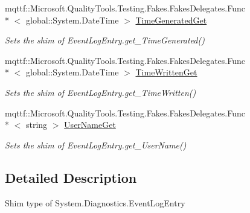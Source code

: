 \begin{DoxyCompactItemize}
mqttf\-::\-Microsoft.\-Quality\-Tools.\-Testing.\-Fakes.\-Fakes\-Delegates.\-Func\\*
$<$ global\-::\-System.\-Date\-Time $>$ \hyperlink{class_system_1_1_diagnostics_1_1_fakes_1_1_shim_event_log_entry_acc70f3bf6c18ae635d2963a784ef7a48}{Time\-Generated\-Get}
\begin{DoxyCompactList}\small\item\em Sets the shim of Event\-Log\-Entry.\-get\-\_\-\-Time\-Generated()\end{DoxyCompactList}\item 
mqttf\-::\-Microsoft.\-Quality\-Tools.\-Testing.\-Fakes.\-Fakes\-Delegates.\-Func\\*
$<$ global\-::\-System.\-Date\-Time $>$ \hyperlink{class_system_1_1_diagnostics_1_1_fakes_1_1_shim_event_log_entry_a4a0c79ea960eb4727a22d11e10d6d453}{Time\-Written\-Get}
\begin{DoxyCompactList}\small\item\em Sets the shim of Event\-Log\-Entry.\-get\-\_\-\-Time\-Written()\end{DoxyCompactList}\item 
mqttf\-::\-Microsoft.\-Quality\-Tools.\-Testing.\-Fakes.\-Fakes\-Delegates.\-Func\\*
$<$ string $>$ \hyperlink{class_system_1_1_diagnostics_1_1_fakes_1_1_shim_event_log_entry_adca7e82ce6f5efa75188ff6b972067f3}{User\-Name\-Get}
\begin{DoxyCompactList}\small\item\em Sets the shim of Event\-Log\-Entry.\-get\-\_\-\-User\-Name()\end{DoxyCompactList}\end{DoxyCompactItemize}


\subsection{Detailed Description}
Shim type of System.\-Diagnostics.\-Event\-Log\-Entry



